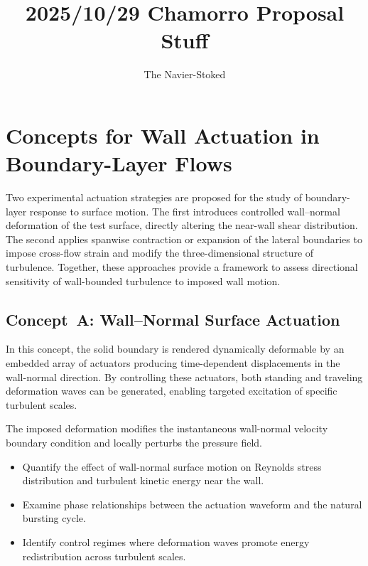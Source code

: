 \documentclass[11pt]{amsart}
\begin{document}
\title{2025/10/29 Chamorro Proposal Stuff}
\author{The Navier-Stoked}
\maketitle

\section{Concepts for Wall Actuation in Boundary-Layer Flows}

Two experimental actuation strategies are proposed for the study of boundary-layer response to surface motion. The first introduces controlled wall--normal deformation of the test surface, directly altering the near-wall shear distribution. The second applies spanwise contraction or expansion of the lateral boundaries to impose cross-flow strain and modify the three-dimensional structure of turbulence. Together, these approaches provide a framework to assess directional sensitivity of wall-bounded turbulence to imposed wall motion.

\subsection{Concept~A: Wall--Normal Surface Actuation}

In this concept, the solid boundary is rendered dynamically deformable by an embedded array of actuators producing time-dependent displacements in the wall-normal direction. By controlling these actuators, both standing and traveling deformation waves can be generated, enabling targeted excitation of specific turbulent scales.


The imposed deformation modifies the instantaneous wall-normal velocity boundary condition and locally perturbs the pressure field. 

\begin{itemize}
    \item Quantify the effect of wall-normal surface motion on Reynolds stress distribution and turbulent kinetic energy near the wall.
    \item Examine phase relationships between the actuation waveform and the natural bursting cycle.
    \item Identify control regimes where deformation waves promote energy redistribution across turbulent scales.
\end{itemize}
\end{document}
